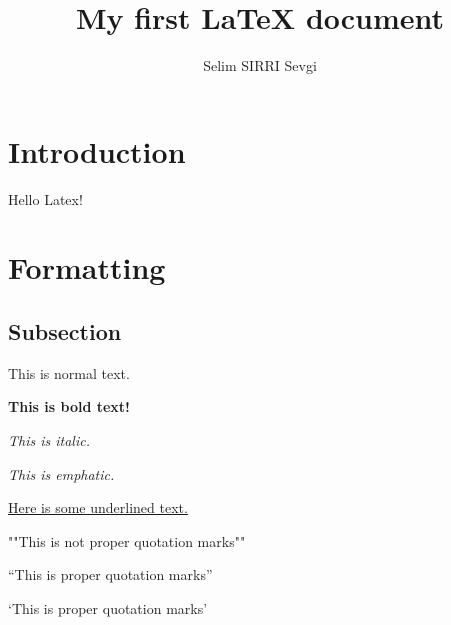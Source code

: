 \documentclass{article}
\author{Selim SIRRI Sevgi}
\title{My first {\LaTeX} document}
\begin{document}
\maketitle

\section{Introduction}

Hello Latex!

\section{Formatting}
\subsection{Subsection}

This is normal text.

\textbf{This is bold text!}

\textit{This is italic.}

\emph{This is emphatic.}

\underline{Here is some underlined text.}


""This is not proper quotation marks""


``This is proper quotation marks''

`This is proper quotation marks'
\end{document}
